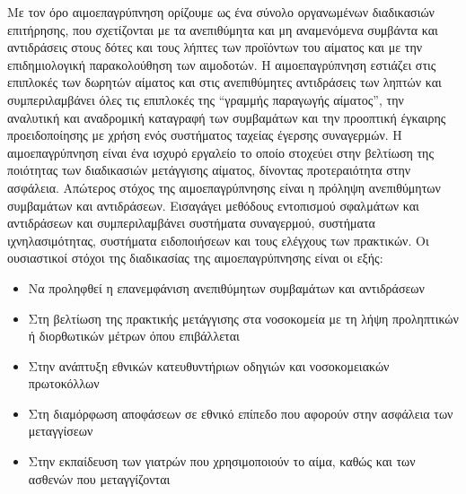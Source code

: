 	Με τον όρο αιμοεπαγρύπνηση ορίζουμε ως ένα σύνολο οργανωμένων διαδικασιών επιτήρησης, που σχετίζονται με τα ανεπιθύμητα και μη αναμενόμενα συμβάντα και αντιδράσεις στους δότες και τους λήπτες των προϊόντων του αίματος και με την επιδημιολογική παρακολούθηση των αιμοδοτών. \cite{VOX:VOX1442}Η αιμοεπαγρύπνηση εστιάζει στις  επιπλοκές των δωρητών αίματος και στις ανεπιθύμητες αντιδράσεις των ληπτών και συμπεριλαμβάνει όλες τις επιπλοκές της “γραμμής παραγωγής αίματος”, την αναλυτική και αναδρομική καταγραφή των συμβαμάτων και την προοπτική έγκαιρης προειδοποίησης με χρήση ενός συστήματος ταχείας έγερσης συναγερμών. Η αιμοεπαγρύπνηση είναι ένα ισχυρό εργαλείο το οποίο στοχεύει στην βελτίωση της ποιότητας των διαδικασιών μετάγγισης αίματος, δίνοντας προτεραιότητα στην ασφάλεια. Απώτερος στόχος της αιμοεπαγρύπνησης είναι η πρόληψη ανεπιθύμητων συμβαμάτων και αντιδράσεων. Εισαγάγει μεθόδους εντοπισμού σφαλμάτων και αντιδράσεων και συμπεριλαμβάνει συστήματα συναγερμού, συστήματα ιχνηλασιμότητας, συστήματα ειδοποιήσεων και τους ελέγχους των πρακτικών.
	Οι ουσιαστικοί στόχοι της διαδικασίας της αιμοεπαγρύπνησης είναι οι εξής:
		\begin{itemize}
		\item Να προληφθεί η επανεμφάνιση ανεπιθύμητων συμβαμάτων και αντιδράσεων 
		\item Στη βελτίωση της πρακτικής μετάγγισης στα νοσοκομεία με τη λήψη προληπτικών ή διορθωτικών μέτρων όπου επιβάλλεται 
		\item Στην ανάπτυξη εθνικών κατευθυντήριων οδηγιών και νοσοκομειακών πρωτοκόλλων 
		\item Στη διαμόρφωση αποφάσεων σε εθνικό επίπεδο που αφορούν στην ασφάλεια των μεταγγίσεων 
		\item Στην εκπαίδευση των γιατρών που χρησιμοποιούν το αίμα, καθώς και των ασθενών που μεταγγίζονται 
		\end{itemize}

